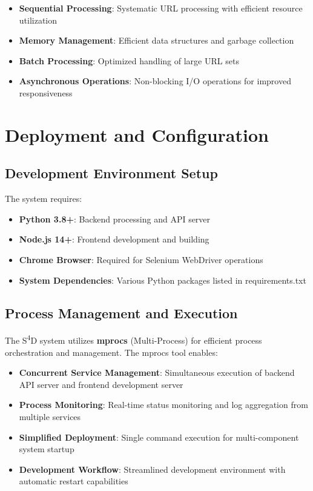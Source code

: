 \begin{itemize}
    \item \textbf{Sequential Processing}: Systematic URL processing with efficient resource utilization
    \item \textbf{Memory Management}: Efficient data structures and garbage collection
    \item \textbf{Batch Processing}: Optimized handling of large URL sets
    \item \textbf{Asynchronous Operations}: Non-blocking I/O operations for improved responsiveness
\end{itemize}

\section{Deployment and Configuration}
\label{sec:deployment-configuration}

\subsection{Development Environment Setup}
The system requires:

\begin{itemize}
    \item \textbf{Python 3.8+}: Backend processing and API server
    \item \textbf{Node.js 14+}: Frontend development and building
    \item \textbf{Chrome Browser}: Required for Selenium WebDriver operations
    \item \textbf{System Dependencies}: Various Python packages listed in requirements.txt
\end{itemize}

\subsection{Process Management and Execution}
The S\textsuperscript{4}D system utilizes \textbf{mprocs} (Multi-Process) for efficient process orchestration and management. The mprocs tool enables:

\begin{itemize}
    \item \textbf{Concurrent Service Management}: Simultaneous execution of backend API server and frontend development server
    \item \textbf{Process Monitoring}: Real-time status monitoring and log aggregation from multiple services
    \item \textbf{Simplified Deployment}: Single command execution for multi-component system startup
    \item \textbf{Development Workflow}: Streamlined development environment with automatic restart capabilities
\end{itemize}

